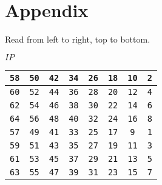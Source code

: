 \documentclass{article}
\begin{document}
  \appendix
  \hypertarget{appendix}{\section{Appendix}}

  Read from left to right, top to bottom.

  \begin{center}
	$IP$ \\
	\vspace{10pt}
	\begin{tabular}{|cccccccc|}
	  \hline
	  \texttt{58} & \texttt{50} & \texttt{42} & \texttt{34} & \texttt{26} & \texttt{18} & \texttt{10} & \texttt{2} \\
	  \hline
	  \texttt{60} & \texttt{52} & \texttt{44} & \texttt{36} & \texttt{28} & \texttt{20} & \texttt{12} & \texttt{4} \\
	  \hline
	  \texttt{62} & \texttt{54} & \texttt{46} & \texttt{38} & \texttt{30} & \texttt{22} & \texttt{14} & \texttt{6} \\
	  \hline
	  \texttt{64} & \texttt{56} & \texttt{48} & \texttt{40} & \texttt{32} & \texttt{24} & \texttt{16} & \texttt{8} \\
	  \hline
	  \texttt{57} & \texttt{49} & \texttt{41} & \texttt{33} & \texttt{25} & \texttt{17} & \texttt{9} & \texttt{1} \\
	  \hline
	  \texttt{59} & \texttt{51} & \texttt{43} & \texttt{35} & \texttt{27} & \texttt{19} & \texttt{11} & \texttt{3} \\
	  \hline
	  \texttt{61} & \texttt{53} & \texttt{45} & \texttt{37} & \texttt{29} & \texttt{21} & \texttt{13} & \texttt{5} \\
	  \hline
	  \texttt{63} & \texttt{55} & \texttt{47} & \texttt{39} & \texttt{31} & \texttt{23} & \texttt{15} & \texttt{7} \\
	  \hline
	\end{tabular}
  \end{center}
\end{document}
